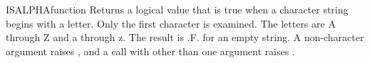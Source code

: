 \begin{XbaseEntry}{ISALPHA}{function}
Returns a logical value that is true when a character string begins with a letter.
\Syntax
{}
\Usage
Only the first character is examined. The letters are A through Z and a through z. The result is .F. for an empty string. A non-character argument raises , and a call with other than one argument raises .
\Examples
{}
\end{XbaseEntry}

